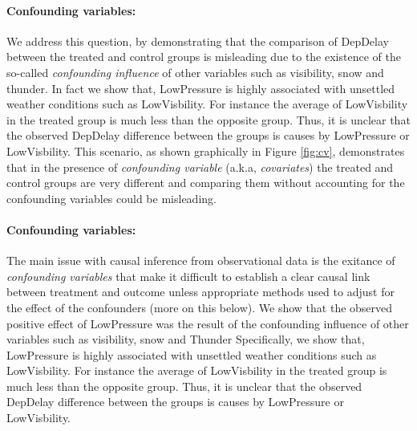  \paragraph{\bf Confounding variables:}  We address this question, by demonstrating that the comparison of DepDelay between the treated and control groups is misleading due to the existence of the so-called {\em  confounding influence} of other variables such as visibility, snow and thunder.  In fact we show that, LowPressure is highly associated with unsettled weather conditions such as LowVisbility. For instance the average of LowVisbility in the treated group is much less than
  the opposite group. Thus, it is unclear that the observed DepDelay difference between the groups is causes by LowPressure or LowVisbility. This scenario, as shown graphically in Figure \ref{fig:cv}, demonstrates that in the presence of {\em confounding variable} (a.k.a, {\em covariates}) the treated and control groups are very different and comparing them without accounting for the confounding variables could be misleading.


 \paragraph{\bf Confounding variables:} The main issue with causal inference from observational data
 is the exitance of {\em confounding variables} that  make it difficult to establish a clear causal link between treatment and outcome unless appropriate methods used to adjust for the effect of the confounders (more on this below).   We show that the observed positive effect of LowPressure
 was the result of the confounding influence of other variables such as visibility, snow and Thunder
    Specifically, we show that, LowPressure is highly associated with unsettled weather conditions such as LowVisbility. For instance the average of LowVisbility in the treated group is much less than
  the opposite group. Thus, it is unclear that the observed DepDelay difference between the groups is causes by LowPressure or LowVisbility.

